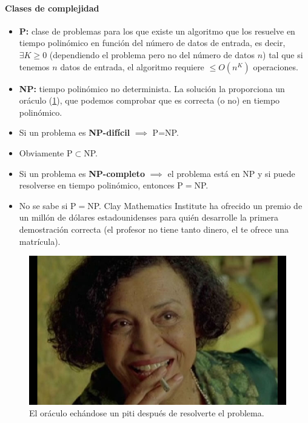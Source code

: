 \paragraph{Clases de complejidad}
\begin{itemize}
	\item \textbf{P:} clase de problemas para los que existe un algoritmo que los resuelve en tiempo polinómico en función del número de datos de entrada, es decir, $\exists K\ge 0$ (dependiendo el problema pero no del número de datos $n$) tal que si tenemos $n$ datos de entrada, el algoritmo requiere $\le O(n^K)$ operaciones.
	\item \textbf{NP:} tiempo polinómico no determinista. La solución la proporciona un oráculo (\ref{fig:oraculo}), que podemos comprobar que es correcta (o no) en tiempo polinómico.
	\item Si un problema es \textbf{NP-difícil} $\implies$ {P}={NP}.
	\item Obviamente P$\subset$NP.
	\item Si un problema es \textbf{NP-completo} $\implies$ el problema está en {NP} y si puede resolverse en tiempo polinómico, entonces P$=$NP.
	\item No se sabe si P$=$NP. Clay Mathematics Institute ha ofrecido un premio de un millón de dólares estadounidenses para quién desarrolle la primera demostración correcta (el profesor no tiene tanto dinero, el te ofrece una matrícula).
\end{itemize}

\begin{figure}[h]
	\centering
	\includegraphics[width=\linewidth/2]{img/oraculo.jpg}
	\caption{El oráculo echándose un piti después de resolverte el problema.}
	\label{fig:oraculo}
\end{figure}

